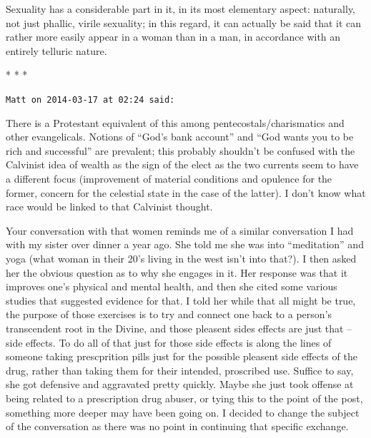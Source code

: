 \begin{quotex}
Sexuality has a considerable part in it, in its most elementary aspect: naturally, not just phallic, virile sexuality; in this regard, it can actually be said that it can rather more easily appear in a woman than in a man, in accordance with an entirely telluric nature.
\end{quotex}




\begin{center}* * *\end{center}

\begin{footnotesize}
\begin{sffamily}
\texttt{Matt on 2014-03-17 at 02:24 said:}

There is a Protestant equivalent of this among pentecostals/charismatics and other evangelicals. Notions of ``God's bank account'' and ``God wants you to be rich and successful'' are prevalent; this probably shouldn't be confused with the Calvinist idea of wealth as the sign of the elect as the two currents seem to have a different focus (improvement of material conditions and opulence for the former, concern for the celestial state in the case of the latter). I don't know what race would be linked to that Calvinist thought.

Your conversation with that women reminds me of a similar conversation I had with my sister over dinner a year ago. She told me she was into ``meditation'' and yoga (what woman in their 20's living in the west isn't into that?). I then asked her the obvious question as to why she engages in it. Her response was that it improves one's physical and mental health, and then she cited some various studies that suggested evidence for that. I told her while that all might be true, the purpose of those exercises is to try and connect one back to a person's transcendent root in the Divine, and those pleasent sides effects are just that -- side effects. To do all of that just for those side effects is along the lines of someone taking prescprition pills just for the possible pleasent side effects of the drug, rather than taking them for their intended, proscribed use. Suffice to say, she got defensive and aggravated pretty quickly. Maybe she just took offense at being related to a prescription drug abuser, or tying this to the point of the post, something more deeper may have been going on. I decided to change the subject of the conversation as there was no point in continuing that specific exchange.


\end{sffamily}
\end{footnotesize}
